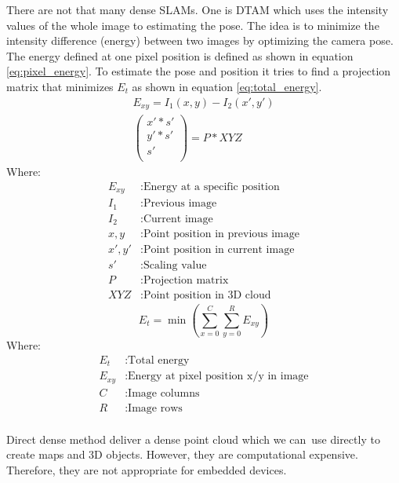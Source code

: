 \documentclass[11pt,a4paper,titlepage,oneside]{report}
\begin{document}
There are not that many dense SLAMs. One is DTAM \cite{dtam} which uses the intensity values of the whole image to estimating the pose. The idea is to minimize the intensity difference (energy) between two images by optimizing the camera pose. The energy defined at one pixel position is defined as shown in equation \ref{eq:pixel_energy}. To estimate the pose and position it tries to find a projection matrix that minimizes $E_{t}$ as shown in equation \ref{eq:total_energy}.
\begin{equation}\label{eq:pixel_energy}
\begin{aligned}
  E_{xy}=I_1(x,y)-I_2(x',y')\\
	\begin{pmatrix}
	x'*s'\\
	y'*s'\\
	s'\\
	\end{pmatrix}=P*XYZ
\end{aligned}
\end{equation}
Where:
\begin{align*}
  E_{xy}	&: \text{Energy at a specific position}\\
  I_1			&: \text{Previous image}\\
  I_2			&: \text{Current image}\\
  x,y			&: \text{Point position in previous image} \\
  x',y'		&: \text{Point position in current image} \\
	s'			&: \text{Scaling value}\\
  P				&: \text{Projection matrix}\\
  XYZ			&: \text{Point position in 3D cloud}
\end{align*}
\begin{equation}\label{eq:total_energy}
  E_{t}=\min(\sum_{x=0}^C\sum_{y=0}^RE_{xy})
\end{equation}
Where:
\begin{align*}
  E_{t}		&: \text{Total energy}\\
  E_{xy}	&: \text{Energy at pixel position x/y in image}\\
	C				&: \text{Image columns}\\
	R				&: \text{Image rows}\\
\end{align*}

Direct dense method deliver a dense point cloud which we can use directly to create maps and 3D objects. However, they are computational expensive. Therefore, they are not appropriate for embedded devices.
\end{document}
